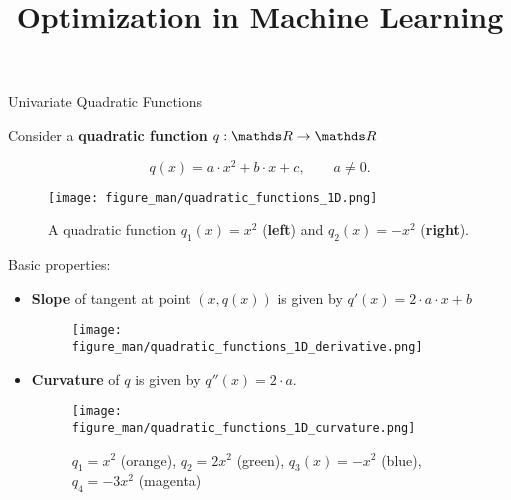 \documentclass[11pt,compress,t,notes=noshow, xcolor=table]{beamer}
\title{Optimization in Machine Learning}
\begin{document}

\begin{vbframe}{Univariate Quadratic Functions}

Consider a \textbf{quadratic function} $q: \R \to \R$

$$
q(x) = a \cdot x^2 + b \cdot x + c, \qquad a \ne 0.
$$


\begin{figure}
    \texttt{[image: figure\_man/quadratic\_functions\_1D.png]} \\
    \caption*{A quadratic function $q_1(x) = x^2$ (\textbf{left}) and $q_2(x) = - x^2$ (\textbf{right}).}
\end{figure}

\framebreak 

Basic properties: 

\begin{itemize}
    \item \textbf{Slope} of tangent at point $(x, q(x))$ is given by $q'(x) = 2 \cdot a \cdot x + b$
        \begin{figure}
            \texttt{[image: figure\_man/quadratic\_functions\_1D\_derivative.png]} \\
        \end{figure}
    \item \textbf{Curvature} of $q$ is given by $q''(x) = 2\cdot a$. 
        \begin{figure}
            \texttt{[image: figure\_man/quadratic\_functions\_1D\_curvature.png]} \\
            \caption*{\footnotesize $q_1 = x^2$ (orange), $q_2 = 2 x^2$ (green), $q_3 (x) = - x^2$ (blue), $q_4 = - 3 x^2$ (magenta)}
        \end{figure}

    \framebreak
    

\end{itemize}
\end{vbframe}
\end{document}
